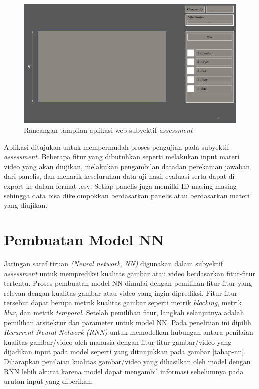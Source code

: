 \begin{figure}[H]
	\vspace{-0.1cm}
	\begin{center}
		\includegraphics[width=1\columnwidth]{bab3/Gambar/single_stimulus.png}
	\end{center}
	\vspace{-0.2cm}
	\caption{Rancangan tampilan aplikasi web subyektif \textit{assessment}} \label{single_stimulus}
\end{figure}

Aplikasi ditujukan untuk mempermudah proses pengujian pada subyektif \textit{assessment}. Beberapa fitur yang dibutuhkan seperti melakukan input materi video yang akan diujikan, melakukan pengambilan datadan perekaman jawaban dari panelis, dan menarik keseluruhan data uji hasil evaluasi serta dapat di export ke dalam format .csv. Setiap panelis juga memilki ID masing-masing sehingga data bisa dikelompokkan berdasarkan panelis atau berdasarkan materi yang diujikan.




\section{Pembuatan Model NN}
\hspace{1,2cm}
Jaringan saraf tiruan \textit{(Neural network, NN)} digunakan dalam subyektif \textit{assessment} untuk memprediksi kualitas gambar atau video berdasarkan fitur-fitur tertentu. Proses pembuatan model NN dimulai dengan pemilihan fitur-fitur yang relevan dengan kualitas gambar atau video yang ingin diprediksi. Fitur-fitur tersebut dapat berupa metrik kualitas gambar seperti metrik \textit{blocking}, metrik \textit{blur}, dan metrik \textit{temporal}. Setelah pemilihan fitur, langkah selanjutnya adalah pemilihan arsitektur dan parameter untuk model NN. Pada penelitian ini dipilih \textit{Recurrent Neural Network (RNN)} untuk memodelkan hubungan antara penilaian kualitas gambar/video oleh manusia dengan fitur-fitur gambar/video yang dijadikan input pada model seperti yang ditunjukkan pada gambar \ref{tahap-nn}. Diharapkan penilaian kualitas gambar/video yang dihasilkan oleh model dengan RNN lebih akurat karena model dapat mengambil informasi sebelumnya pada urutan input yang diberikan.

